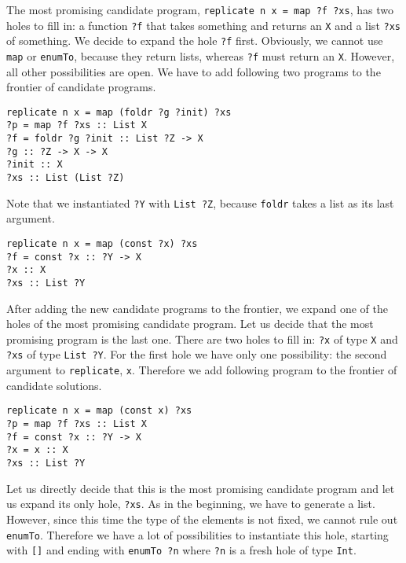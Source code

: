 The most promising candidate program, \lstinline!replicate n x = map ?f ?xs!, has two holes to fill in: a function \lstinline!?f! that takes something and returns an \lstinline?X? and a list \lstinline!?xs! of something. We decide to expand the hole \lstinline!?f! first. Obviously, we cannot use \lstinline?map? or \lstinline?enumTo?, because they return lists, whereas \lstinline!?f! must return an \lstinline!X!. However, all other possibilities are open. We have to add following two programs to the frontier of candidate programs.

\begin{lstlisting}[style=plain]
replicate n x = map (foldr ?g ?init) ?xs
?p = map ?f ?xs :: List X
?f = foldr ?g ?init :: List ?Z -> X
?g :: ?Z -> X -> X
?init :: X
?xs :: List (List ?Z)
\end{lstlisting}
Note that we instantiated \lstinline!?Y! with \lstinline!List ?Z!, because \lstinline?foldr? takes a list as its last argument.

\begin{lstlisting}[style=plain]
replicate n x = map (const ?x) ?xs
?f = const ?x :: ?Y -> X
?x :: X
?xs :: List ?Y
\end{lstlisting}

After adding the new candidate programs to the frontier, we expand one of the holes of the most promising candidate program. Let us decide that the most promising program is the last one.
There are two holes to fill in: \lstinline!?x! of type \lstinline!X! and \lstinline!?xs! of type \lstinline!List ?Y!. For the first hole we have only one possibility: the second argument to \lstinline!replicate!, \lstinline!x!. Therefore we add following program to the frontier of candidate solutions.

\begin{lstlisting}[style=plain]
replicate n x = map (const x) ?xs
?p = map ?f ?xs :: List X
?f = const ?x :: ?Y -> X
?x = x :: X
?xs :: List ?Y
\end{lstlisting}

Let us directly decide that this is the most promising candidate program and let us expand its only hole, \lstinline!?xs!.
As in the beginning, we have to generate a list. However, since this time the type of the elements is not fixed, we cannot rule out  \lstinline?enumTo?.
Therefore we have a lot of possibilities to instantiate this hole, starting with \lstinline?[]? and ending with \lstinline!enumTo ?n! where \lstinline!?n! is a fresh hole of type \lstinline!Int!.

